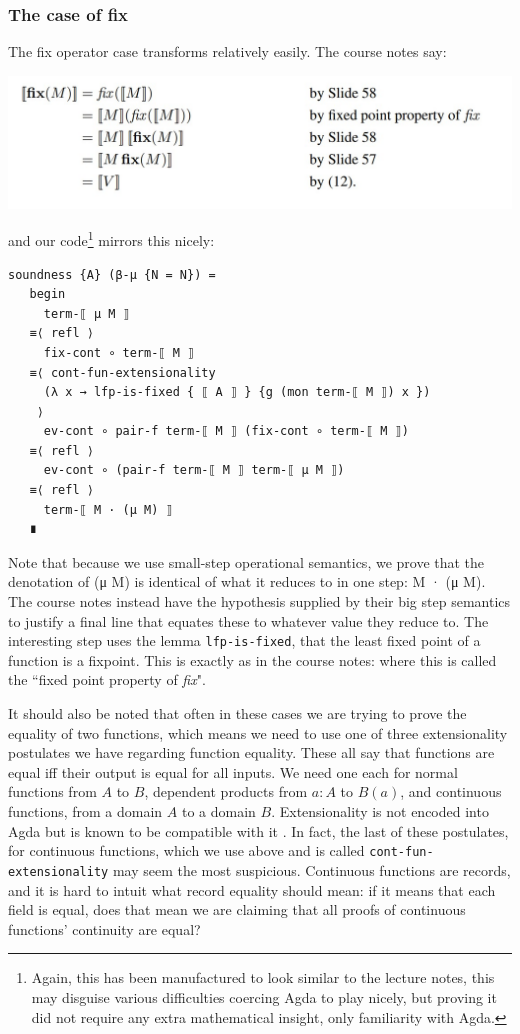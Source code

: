 \documentclass[12pt,a4paper,twoside,openright]{report}
\begin{document}
\subsubsection{The case of fix}
The fix operator case transforms relatively easily. The course notes say:
\begin{center}
\includegraphics[scale = 0.7]{figs/fix_soundness}
\end{center}
and our code\footnote{Again, this has been manufactured to look similar to the lecture notes, this may disguise various difficulties coercing Agda to play nicely, but proving it did not require any extra mathematical insight, only familiarity with Agda.} mirrors this nicely:
\begin{verbatim}
soundness {A} (β-μ {N = N}) =
   begin
     term-⟦ μ M ⟧
   ≡⟨ refl ⟩
     fix-cont ∘ term-⟦ M ⟧
   ≡⟨ cont-fun-extensionality
     (λ x → lfp-is-fixed { ⟦ A ⟧ } {g (mon term-⟦ M ⟧) x })
    ⟩
     ev-cont ∘ pair-f term-⟦ M ⟧ (fix-cont ∘ term-⟦ M ⟧)
   ≡⟨ refl ⟩
     ev-cont ∘ (pair-f term-⟦ M ⟧ term-⟦ μ M ⟧)
   ≡⟨ refl ⟩
     term-⟦ M · (μ M) ⟧
   ∎
\end{verbatim}
Note that because we use small-step operational semantics, we prove that the denotation of (μ M) is identical of what it reduces to in one step: M · (μ M). The course notes instead have the hypothesis supplied by their big step semantics to justify a final line that equates these to whatever value they reduce to. The interesting step uses the lemma \texttt{lfp-is-fixed}, that the least fixed point of a function is a fixpoint. This is exactly as in the course notes: where this is called the ``fixed point property of \textit{fix}". 

It should also be noted that often in these cases we are trying to prove the equality of two functions, which means we need to use one of three extensionality postulates we have regarding function equality. These all say that functions are equal iff their output is equal for all inputs. We need one each for normal functions from $A$ to $B$, dependent products from $a : A$ to $B(a)$, and continuous functions, from a domain $A$ to a domain $B$. Extensionality is not encoded into Agda but is known to be compatible with it \cite{PLFA}. In fact, the last of these postulates, for continuous functions, which we use above and is called \texttt{cont-fun-extensionality} may seem the most suspicious. Continuous functions are records, and it is hard to intuit what record equality should mean: if it means that each field is equal, does that mean we are claiming that all proofs of continuous functions' continuity are equal? 
	
\end{document}
